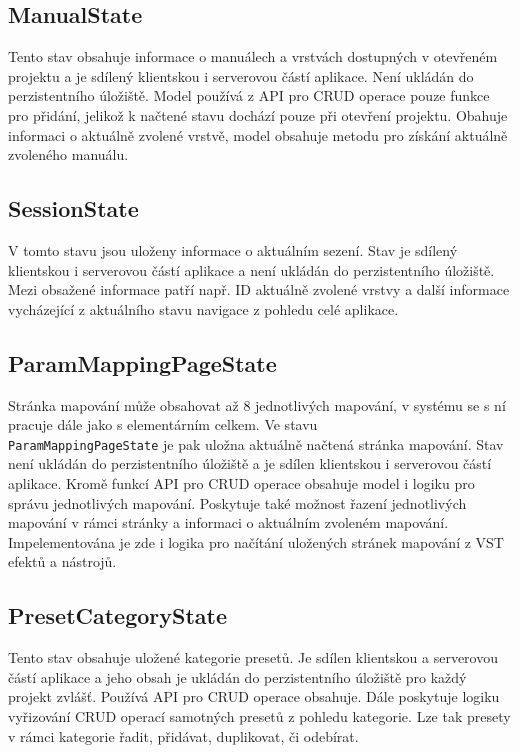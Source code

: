 \documentclass[thesis=M,czech]{FITthesis}[2019/03/06]
\begin{document}
		\subsection{ManualState}
			Tento stav obsahuje informace o manuálech a vrstvách dostupných v otevřeném projektu a je sdílený klientskou i serverovou částí aplikace. Není ukládán do perzistentního úložiště.
			Model používá z API pro CRUD operace pouze funkce pro přidání, jelikož k načtené stavu
			dochází pouze při otevření projektu. Obahuje informaci o aktuálně zvolené vrstvě, model obsahuje metodu
			pro získání aktuálně zvoleného manuálu.
		
		\subsection{SessionState}
			V tomto stavu jsou uloženy informace o aktuálním sezení. Stav je sdílený klientskou i serverovou částí aplikace a není ukládán do perzistentního úložiště.
			Mezi obsažené informace patří např. ID aktuálně zvolené vrstvy a další informace vycházející z aktuálního stavu navigace z pohledu celé aplikace.
			
		\subsection{ParamMappingPageState}
			Stránka mapování může obsahovat až 8 jednotlivých mapování, v systému se s ní pracuje dále jako s elementárním celkem. 
			Ve stavu \\\texttt{ParamMappingPageState} je pak uložna aktuálně načtená stránka mapování. Stav není ukládán do perzistentního úložiště a je sdílen klientskou i serverovou částí aplikace. 
			Kromě funkcí API pro CRUD operace obsahuje model i logiku pro správu jednotlivých mapování. 
			Poskytuje také možnost řazení jednotlivých mapování v rámci stránky a informaci
			o aktuálním zvoleném mapování. Impelementována je zde i logika pro načítání uložených stránek mapování
			z VST efektů a nástrojů.
			
		\subsection{PresetCategoryState}
			Tento stav obsahuje uložené kategorie presetů. Je sdílen klientskou a serverovou částí aplikace
			a jeho obsah je ukládán do perzistentního úložiště pro každý projekt zvlášť.
			Používá API pro CRUD operace obsahuje. Dále poskytuje logiku vyřizování CRUD operací samotných presetů
			z pohledu kategorie. Lze tak presety v rámci kategorie řadit, přidávat, duplikovat, či odebírat.
			
\end{document}
